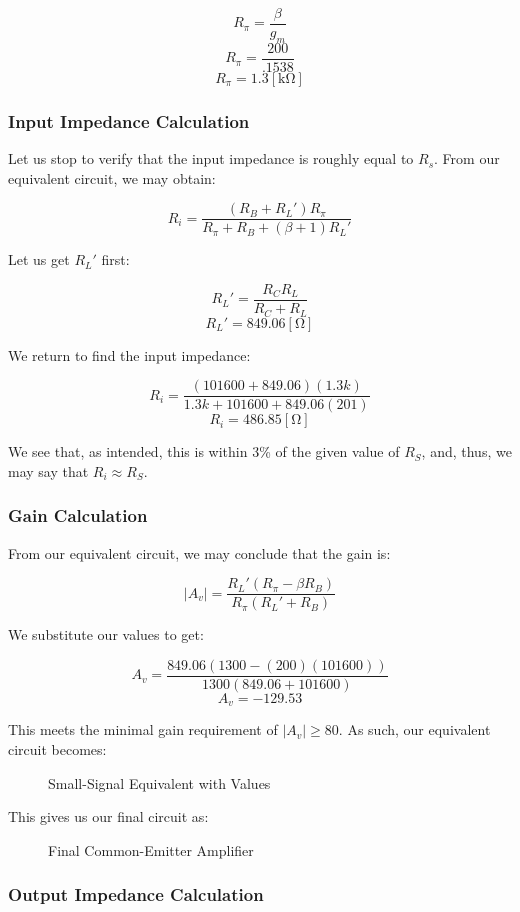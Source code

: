 \documentclass[
	letterpaper, %
	10pt, %
]{CSUniSchoolLabReport}
\begin{document}
$$R_{\pi}=\frac{\beta}{g_m}$$
$$R_{\pi}=\frac{200}{.1538}$$
$$\boxed{R_{\pi}=1.3[\si{\kilo\ohm}]}$$

\subsubsection{Input Impedance Calculation}

Let us stop to verify that the input impedance is roughly equal to $R_s$. From our equivalent circuit, we may obtain:

$$R_i=\frac{(R_B+R_L')R_{\pi}}{R_{\pi}+R_B+(\beta+1)R_L'}$$

Let us get $R_L'$ first:

$$R_L'=\frac{R_CR_L}{R_C+R_L}$$
$$\boxed{R_L'=849.06[\si{\ohm}]}$$

We return to find the input impedance:

$$R_i=\frac{(101600+849.06)(1.3k)}{1.3k+101600+849.06(201)}$$
$$\boxed{R_i=486.85[\si{\ohm}]}$$

We see that, as intended, this is within 3\% of the given value of $R_S$, and, thus, we may say that $R_i\approx R_S$. 

\subsubsection{Gain Calculation}

From our equivalent circuit, we may conclude that the gain is:

$$|A_v|=\frac{R_L'(R_{\pi}-\beta R_B)}{R_{\pi}(R_L'+R_B)}$$

We substitute our values to get:

$$A_v=\frac{849.06(1300-(200)(101600))}{1300(849.06+101600)}$$
$$\boxed{A_v=-129.53}$$

This meets the minimal gain requirement of $|A_v|\geq 80$. As such, our equivalent circuit becomes:

\begin{figure}[H]
  \centering
  
  \caption{Small-Signal Equivalent with Values}
  \label{fig:4}
\end{figure}

This gives us our final circuit as:

\begin{figure}[H]
  \centering
  
  \caption{Final Common-Emitter Amplifier}
  \label{fig:5}
\end{figure}

\subsubsection{Output Impedance Calculation}
\end{document}
